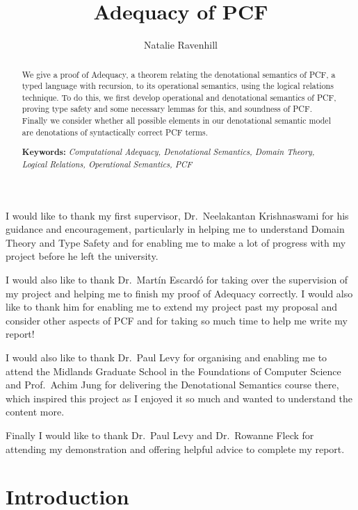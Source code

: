 \documentclass{bhamthesis}
\title{Adequacy of PCF}
\author{Natalie Ravenhill}
\begin{document}
\maketitle
\newcommand{\natb}{\mathbb{N}_{\bot}}
\begin{abstract}
We give a proof of Adequacy, a theorem relating the denotational semantics of PCF, a typed language with recursion,  to its operational semantics, using the logical relations technique. To do this, we first develop operational and denotational semantics of PCF, proving type safety and some necessary lemmas for this, and soundness of PCF. Finally we consider whether all possible elements in our denotational semantic model are denotations of syntactically correct PCF terms.
\vspace{0.5cm}

\textbf{Keywords:} \emph{Computational Adequacy, Denotational Semantics, Domain Theory,  Logical Relations, Operational Semantics, PCF}
\end{abstract}

\begin{acknowledgements}
I would like to thank my first supervisor, Dr.\ Neelakantan Krishnaswami for   his guidance and encouragement, particularly in helping me to understand Domain Theory and Type Safety and for enabling me to make a lot of progress with my project before he left the university.

I would also like to thank Dr.\ Mart\'{i}n Escard\'{o} for taking over the supervision of my project and helping me to finish my proof of Adequacy correctly. I would also like to thank him for enabling me to extend my project past my proposal and consider other aspects of PCF and for taking so much time to help me write my report!

I would also like to thank Dr.\ Paul Levy for organising and enabling me to attend the Midlands Graduate School in the Foundations of Computer Science and Prof.\ Achim Jung for delivering the Denotational Semantics course there, which inspired this project as I enjoyed it so much and wanted to understand the content more. 

Finally I would like to thank Dr.\ Paul Levy and Dr.\ Rowanne Fleck for attending my demonstration and offering helpful advice to complete my report.
\end{acknowledgements}

\tableofcontents
\chapter{Introduction}\label{ch1}

\end{document}
